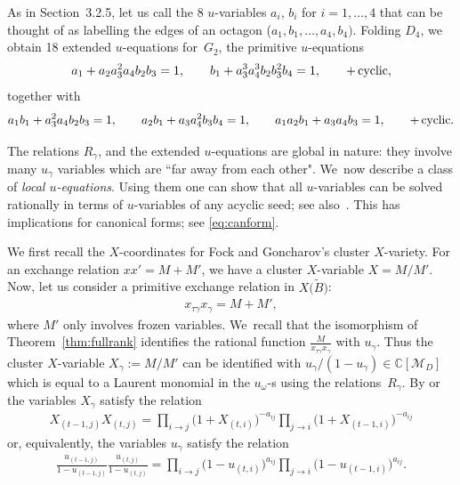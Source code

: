 \documentclass[10pt,a4paper]{amsart}
\def\C{{\mathbb C}}
\def\tB{{\tilde B}}
\def\M{{\mathcal{M}}}
\def\tB{{\tilde B}}
\numberwithin{equation}{section}
\begin{document}
\medskip{} %
As in Section~{3.2.5}, let us call the 8 $u$-variables $a_i$, $b_i$ for $i=1,\dots,4$ that can be thought of as labelling the edges of an octagon ($a_1,b_1,\dots,a_4,b_4)$. Folding $D_4$, we obtain 18 extended $u$-equations for~$G_2$, the primitive $u$-equations
\begin{gather*}
a_1 + a_2 a_3^2 a_4 b_2 b_3=1,\qquad b_1 + a_3^3 a_4^3 b_2 b_3^2 b_4=1, \qquad
{\rm + \, cyclic},
\end{gather*}
together with
\begin{gather*}
a_1 b_1 + a_3^2 a_4 b_2 b_3=1,\qquad a_2 b_1 + a_3 a_4^2 b_3 b_4=1,\qquad a_1 a_2 b_1 + a_3 a_4 b_3=1, \qquad
{\rm + \, cyclic}.
\end{gather*}

\bigskip{} %
The relations $R_\gamma$, and the extended $u$-equations are global in nature: they involve many $u_\gamma$ variables which are ``far away from each other". We~now describe a class of {\it local $u$-equations}. Using them one can show that all $u$-variables can be solved rationally in terms of $u$-variables of any acyclic seed; see also~\cite{AHLT}. This has implications for canonical forms; see \eqref{eq:canform}.

We first recall the $X$-coordinates for Fock and Goncharov's cluster $X$-variety. For an exchange relation $x x' = M + M'$, we have a cluster $X$-variable $X=M/M'$. Now, let us consider a primitive exchange relation in $X\big(\tB\big)$:
\begin{gather*}
x_{\tau \gamma} x_{\gamma} = M + M',
\end{gather*}
where $M'$ only involves frozen variables. We~recall that the isomorphism of Theorem~\ref{thm:fullrank} identifies the rational function $\frac{M}{x_{\tau \gamma} x_{\gamma}}$ with $u_\gamma$. Thus the cluster $X$-variable $X_\gamma:= M/M'$ can be identified with $u_\gamma/(1-u_\gamma) \in \C[\M_D]$ which is equal to a Laurent monomial in the $u_\omega$-s using the relations~$R_\gamma$. By \cite{FZY} or \cite[Proposition~3.9 or equation~(8.11)]{CA4} the variables $X_\gamma$ satisfy the relation
\begin{gather}\label{eq:localX}
X_{(t-1,j)} X_{(t,j)} = \prod_{i \to j} \big(1+X_{(t,i)}\big)^{-a_{ij}} \prod_{j \to i} \big(1+ X_{(t-1,i)}\big)^{-a_{ij}}
\end{gather}
or, equivalently, the variables $u_\gamma$ satisfy the relation
\begin{gather*}%
\frac{u_{(t-1,j)} }{1-u_{(t-1,j)} } \frac{u_{(t,j)} }{1-u_{(t,j)} }= \prod_{i \to j} \big(1-u_{(t,i)}\big)^{a_{ij}} \prod_{j \to i} \big(1-u_{(t-1,i)}\big)^{a_{ij}}.
\end{gather*}
\end{document}
